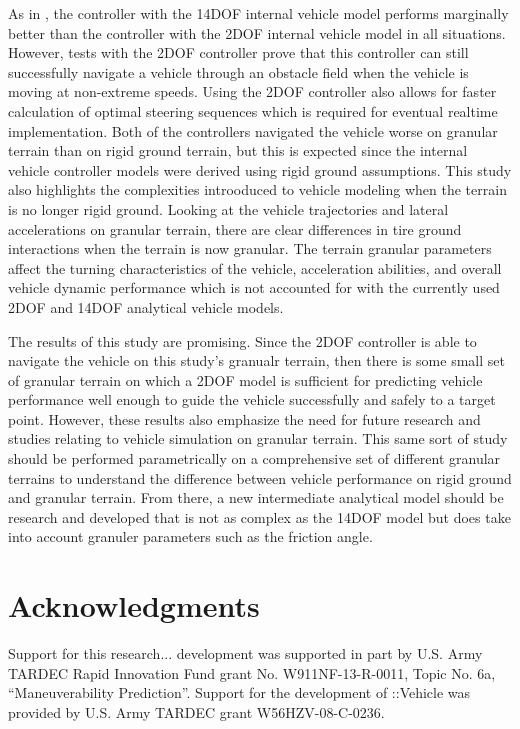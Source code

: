 \documentclass[12pt,twocolumn]{article}
\newcommand{\CHRONO}{{\sffamily{{Chrono}}}}
\newcommand{\ChronoVehicle}{{\sffamily{Chrono}}::Vehicle}
\begin{document}
As in \cite{ModelFidelity2016}, the controller with the 14DOF internal vehicle model performs marginally better than the controller with the 2DOF internal vehicle model in all situations. However, tests with the 2DOF controller prove that this controller can still successfully navigate a vehicle through an obstacle field when the vehicle is moving at non-extreme speeds. Using the 2DOF controller also allows for faster calculation of optimal steering sequences which is required for eventual realtime implementation. Both of the controllers navigated the vehicle worse on granular terrain than on rigid ground terrain, but this is expected since the internal vehicle controller models were derived using rigid ground assumptions. This study also highlights the complexities introoduced to vehicle modeling when the terrain is no longer rigid ground. Looking at the vehicle trajectories and lateral accelerations on granular terrain, there are clear differences in tire ground interactions when the terrain is now granular. The terrain granular parameters affect the turning characteristics of the vehicle, acceleration abilities, and overall vehicle dynamic performance which is not accounted for with the currently used 2DOF and 14DOF analytical vehicle models. 

The results of this study are promising. Since the 2DOF controller is able to navigate the {\CHRONO} vehicle on this study's granualr terrain, then there is some small set of granular terrain on which a 2DOF model is sufficient for predicting vehicle performance well enough to guide the vehicle successfully and safely to a target point. However, these results also emphasize the need for future research and studies relating to vehicle simulation on granular terrain. This same sort of study should be performed parametrically on a comprehensive set of different granular terrains to understand the difference between vehicle performance on rigid ground and granular terrain. From there, a new intermediate analytical model should be research and developed that is not as complex as the 14DOF model but does take into account granuler parameters such as the friction angle. 


\section*{Acknowledgments}
Support for this research...
{\CHRONO} development was supported in part by U.S. Army TARDEC Rapid Innovation Fund grant No. W911NF-13-R-0011, Topic No. 6a, ``Maneuverability Prediction''.
Support for the development of {\ChronoVehicle} was provided by U.S. Army TARDEC grant W56HZV-08-C-0236.





\end{document}
